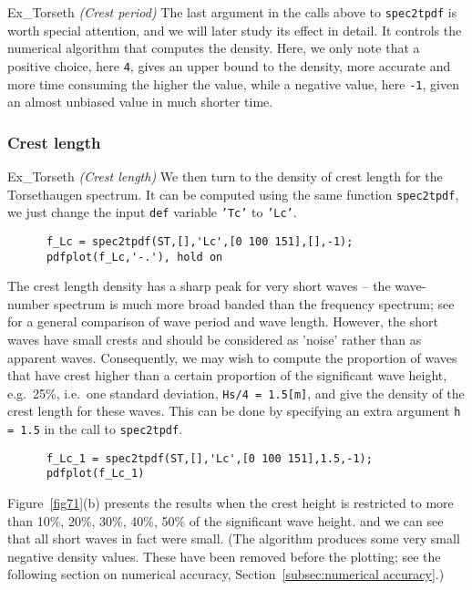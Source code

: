 \begin{cex}{Ex_Torseth} {\sl (Crest period)}
The last argument in the calls above to {\tt spec2tpdf} is worth
special attention, and we will later study its effect in detail.
It controls the numerical algorithm that computes the density. Here, we
only note that a positive choice, here {\tt 4}, gives an upper bound
to the density, more accurate and more time consuming the higher the value,
while a negative value, here {\tt -1}, given an almost unbiased value in much shorter time.
\end{cex}

\subsubsection{Crest length}
\begin{cex}{Ex_Torseth}  {\sl (Crest length)} \label{pageTorsethCrestLength}
We then turn to the density of crest length for the Torsethaugen spectrum.
It can be computed using the same function {\tt spec2tpdf}, we just
change the input {\tt def} variable {\tt 'Tc'} to {\tt 'Lc'}.
{\small\begin{verbatim}
      f_Lc = spec2tpdf(ST,[],'Lc',[0 100 151],[],-1);
      pdfplot(f_Lc,'-.'), hold on
\end{verbatim}}

The crest length density has a sharp peak for very short waves
-- the wave-number spectrum is much  more broad banded than
the frequency spectrum; see \cite{LindgrenEtal1998Relation}
for a general comparison of wave period and wave length.
However, the short waves have small crests and
should be considered as 'noise' rather than as apparent waves.
Consequently, we may wish to compute the proportion of waves that have crest
higher than a certain proportion of the significant wave height, e.g.\
25\%, i.e.\ one standard deviation, \verb+Hs/4 = 1.5[m]+,
and give the density of the crest length for these waves. This can be
done by specifying an extra argument {\tt h = 1.5} in the call to \verb+spec2tpdf+.
{\small\begin{verbatim}
      f_Lc_1 = spec2tpdf(ST,[],'Lc',[0 100 151],1.5,-1);
      pdfplot(f_Lc_1)
\end{verbatim}}

Figure~\ref{fig71}(b) presents the results when the crest height is
restricted to more than 10\%, 20\%, 30\%, 40\%, 50\% of the
significant wave height. and we can see that all short
waves in fact were small. (The algorithm produces some
very small negative density values. These have been removed before
the plotting; see the following section on numerical accuracy,
Section~\ref{subsec:numerical accuracy}.)


\end{cex}
